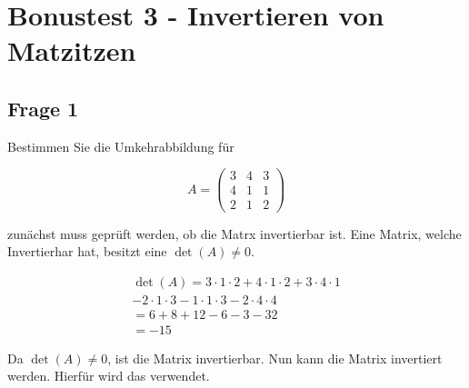 \chapter{Bonustest 3 - Invertieren von Matzitzen}

\section{Frage 1}

Bestimmen Sie die Umkehrabbildung für

\[
    A = \begin{pmatrix}
        3 & 4 & 3 \\
        4 & 1 & 1 \\
        2 & 1 & 2
    \end{pmatrix}
\]

zunächst muss geprüft werden, ob die Matrx invertierbar ist. Eine Matrix, welche Invertierhar hat, besitzt eine $\det(A) \neq 0$.

\begin{align*}
    \det(A) = 3 \cdot 1 \cdot 2 + 4 \cdot 1 \cdot 2 + 3 \cdot 4 \cdot 1 \\
    - 2 \cdot 1 \cdot 3 - 1 \cdot 1 \cdot 3 - 2 \cdot 4 \cdot 4 \\
    = 6 + 8 + 12 - 6 - 3 - 32 \\
    = -15
\end{align*}

Da $\det(A) \neq 0$, ist die Matrix invertierbar. Nun kann die Matrix invertiert werden. Hierfür wird das  verwendet.

